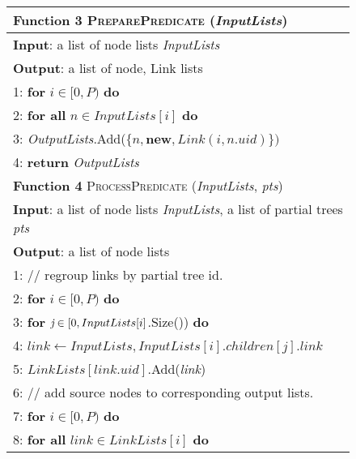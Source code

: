 \begin{figure}[t]
	\centering
	\label{fig:funPreparePredicate}
	\begin{tabular}{l}
		\hline
		\textbf{Function 3} \textsc{PreparePredicate} (\emph{InputLists}) \\
		\hline
		\textbf{Input}: a list of node lists \emph{InputLists} \\
		\textbf{Output}: a list of {node, Link} lists \\
		1: \hspace{1 mm} \textbf{for} $i \in [0, P)$ \textbf{do} \\
		2: \hspace{4 mm} \textbf{for all} $n \in \mathit{InputLists}[i]$ \textbf{do} \\
		3: \hspace{8 mm} \emph{OutputLists}.Add($\{n, \textbf{new}, \mathit{Link}(i, n.uid)\})$ \\
		4: \hspace{1 mm} \textbf{return} \emph{OutputLists} \\
		\hline
		\textbf{Function 4} \textsc{ProcessPredicate}  (\emph{InputLists}, \emph{pts}) \\
		\hline
		\textbf{Input}: a list of node lists \emph{InputLists}, a list of partial trees \emph{pts} \\
		\textbf{Output}: a list of node lists \\
		1: \hspace{1 mm} // regroup links by partial tree id. \\
		2: \hspace{1 mm} \textbf{for} $i \in [0, P)$ \textbf{do} \\
		3: \hspace{4 mm} \textbf{for} $\emph{j} \in [0, InputLists[i]$.Size()) \textbf{do} \\
		4: \hspace{8 mm} $ link \leftarrow \mathit{InputLists}, InputLists[i].children[j].link$ \\
		5: \hspace{8 mm} $LinkLists[link.uid]$.Add(\emph{link}) \\
		6: \hspace{1 mm} // add source nodes to corresponding output lists. \\
		7: \hspace{1 mm} \textbf{for} $i \in [0, P)$ \textbf{do} \\
		8: \hspace{4 mm} \textbf{for all} $link \in LinkLists[i]$ \textbf{do} \\

\end{tabular}
\end{figure}
